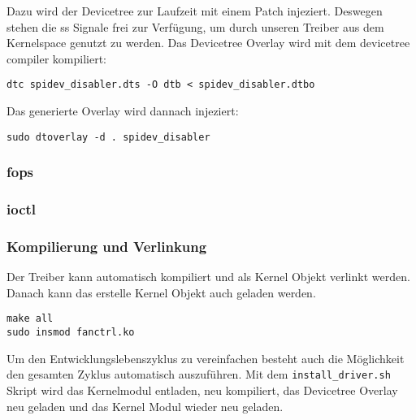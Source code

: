 Dazu wird der Devicetree zur Laufzeit mit einem Patch injeziert.
Deswegen stehen die \gls{ss} Signale frei zur Verfügung, um durch unseren Treiber aus dem Kernelspace genutzt zu werden.
Das Devicetree Overlay wird mit dem devicetree compiler kompiliert:
\begin{lstlisting}
dtc spidev_disabler.dts -O dtb < spidev_disabler.dtbo
\end{lstlisting}
Das generierte Overlay wird dannach injeziert:
\begin{lstlisting}
sudo dtoverlay -d . spidev_disabler
\end{lstlisting}

\subsubsection{\acrshort{fops}}


\subsubsection{\Acrshort{ioctl}}


\subsubsection{Kompilierung und Verlinkung}

Der Treiber kann automatisch kompiliert und als Kernel Objekt verlinkt werden.
Danach kann das erstelle Kernel Objekt auch geladen werden.
\begin{lstlisting}
make all
sudo insmod fanctrl.ko
\end{lstlisting}

Um den Entwicklungslebenszyklus zu vereinfachen besteht auch die Möglichkeit den gesamten Zyklus automatisch auszuführen.
Mit dem \texttt{install\_driver.sh} Skript wird das Kernelmodul entladen, neu kompiliert, das Devicetree Overlay neu geladen und das Kernel Modul wieder neu geladen.
